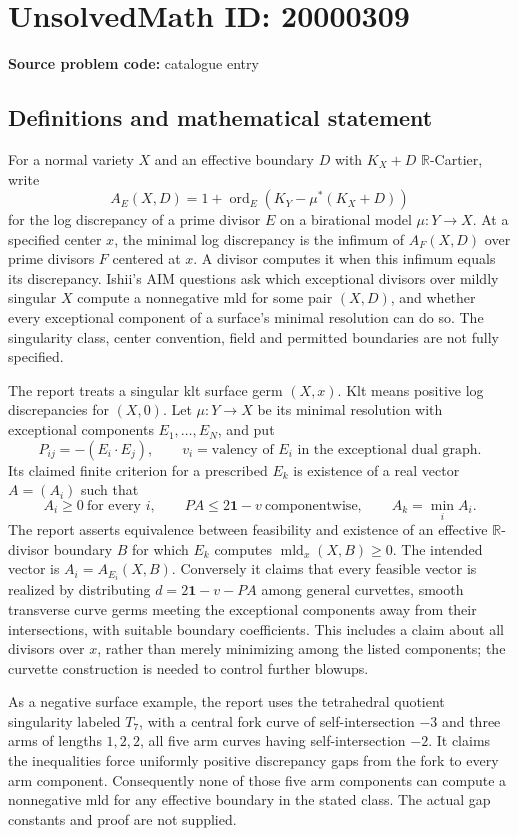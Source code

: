 \documentclass[11pt]{article}
\newcommand{\R}{\mathbb{R}}
\begin{document}
\section*{UnsolvedMath ID: 20000309}
\textbf{Source problem code:} catalogue entry
\subsection{Definitions and mathematical statement}
For a normal variety $X$ and an effective boundary $D$ with $K_X+D$ $\R$-Cartier, write
\[
 A_E(X,D)=1+\operatorname{ord}_E(K_Y-\mu^*(K_X+D))
\]
for the log discrepancy of a prime divisor $E$ on a birational model $\mu:Y\to X$. At a specified center $x$, the minimal log discrepancy is the infimum of $A_F(X,D)$ over prime divisors $F$ centered at $x$. A divisor computes it when this infimum equals its discrepancy. Ishii's AIM questions ask which exceptional divisors over mildly singular $X$ compute a nonnegative mld for some pair $(X,D)$, and whether every exceptional component of a surface's minimal resolution can do so. The singularity class, center convention, field and permitted boundaries are not fully specified.

The report treats a singular klt surface germ $(X,x)$. Klt means positive log discrepancies for $(X,0)$. Let $\mu:Y\to X$ be its minimal resolution with exceptional components $E_1,\ldots,E_N$, and put
\[
 P_{ij}=-(E_i\cdot E_j),\qquad v_i=\text{valency of }E_i\text{ in the exceptional dual graph}.
\]
Its claimed finite criterion for a prescribed $E_k$ is existence of a real vector $A=(A_i)$ such that
\[
 A_i\geq0\ \text{for every }i,\qquad
 PA\leq2\mathbf1-v\ \text{componentwise},\qquad
 A_k=\min_iA_i.
\]
The report asserts equivalence between feasibility and existence of an effective $\R$-divisor boundary $B$ for which $E_k$ computes $\operatorname{mld}_x(X,B)\geq0$. The intended vector is $A_i=A_{E_i}(X,B)$. Conversely it claims that every feasible vector is realized by distributing $d=2\mathbf1-v-PA$ among general curvettes, smooth transverse curve germs meeting the exceptional components away from their intersections, with suitable boundary coefficients. This includes a claim about all divisors over $x$, rather than merely minimizing among the listed components; the curvette construction is needed to control further blowups.

As a negative surface example, the report uses the tetrahedral quotient singularity labeled $T_7$, with a central fork curve of self-intersection $-3$ and three arms of lengths $1,2,2$, all five arm curves having self-intersection $-2$. It claims the inequalities force uniformly positive discrepancy gaps from the fork to every arm component. Consequently none of those five arm components can compute a nonnegative mld for any effective boundary in the stated class. The actual gap constants and proof are not supplied.
\end{document}
